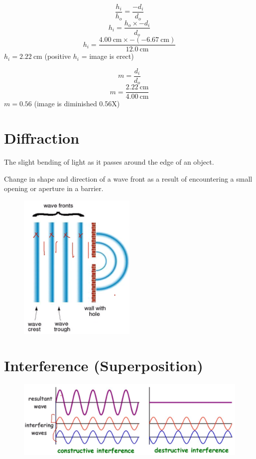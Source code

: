 \documentclass[a4paper,12pt]{article}
\begin{document}
$$\frac{h_i}{h_o} = \frac{-d_i}{d_o}$$
$$h_i = \frac{h_o \times -d_i}{d_o}$$
$$h_i = \frac{\SI{4.00}{\cm} \times -(\SI{-6.67}{\cm})}{\SI{12.0}{\cm}}$$
$h_i = \SI{2.22}{\cm}$ (positive $h_i$ = image is erect)

$$m = \frac{d_i}{d_o}$$
$$m = \frac{\SI{2.22}{\cm}}{\SI{4.00}{\cm}}$$
$m = \num{0.56}$ (image is diminished 0.56X)

\section{Diffraction}
The slight bending of light as it passes around the edge of an object.

Change in shape and direction of a wave front as a result of encountering a small opening or aperture in a barrier.
\begin{figure}[H]
    \centering
    \includegraphics[width=0.50\textwidth]{diffraction}
\end{figure}

\section{Interference (Superposition)}
\begin{figure}[H]
    \centering
    \includegraphics[width=\textwidth]{interference}
\end{figure}
\end{document}
